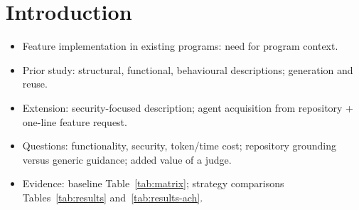 \section{Introduction}
\label{sec:introduction}

\begin{itemize}
\item Feature implementation in existing programs: need for program context.
\item Prior study: structural, functional, behavioural descriptions;
generation and reuse.
\item Extension: security-focused description; agent acquisition from
repository + one-line feature request.
\item Questions: functionality, security, token/time cost;
repository grounding versus generic guidance; added value of a judge.
\item Evidence: baseline Table~\ref{tab:matrix}; strategy comparisons
Tables~\ref{tab:results} and~\ref{tab:results-ach}.
\end{itemize}
